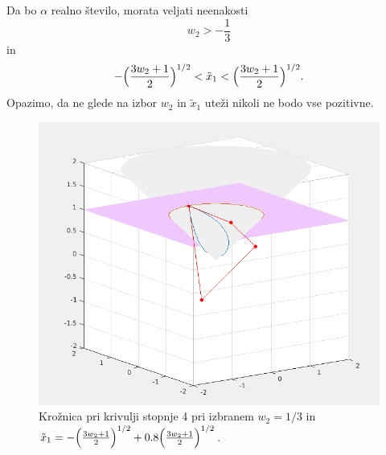 \documentclass[a4paper,12pt]{article}
\begin{document}
Da bo $\alpha$ realno število, morata veljati neenakosti $$w_2 > -\frac{1}{3}$$ in $$-\Big{(}\frac{3w_2+1}{2}\Big{)}^{1/2} < \tilde{x}_1 < \Big{(}\frac{3w_2+1}{2}\Big{)}^{1/2}.$$
Opazimo, da ne glede na izbor $w_2$ in $\tilde{x}_1$ uteži nikoli ne bodo vse pozitivne.
\begin{figure}[h!]
\includegraphics[scale=0.35]{kvarticna.png}
\centering
\caption{Krožnica pri krivulji stopnje 4 pri izbranem $w_2 = 1/3$ in $\tilde{x}_1 = -\Big{(}\frac{3w_2+1}{2}\Big{)}^{1/2} + 0.8 \Big{(}\frac{3w_2+1}{2}\Big{)}^{1/2}$.}
\end{figure}
\end{document}
